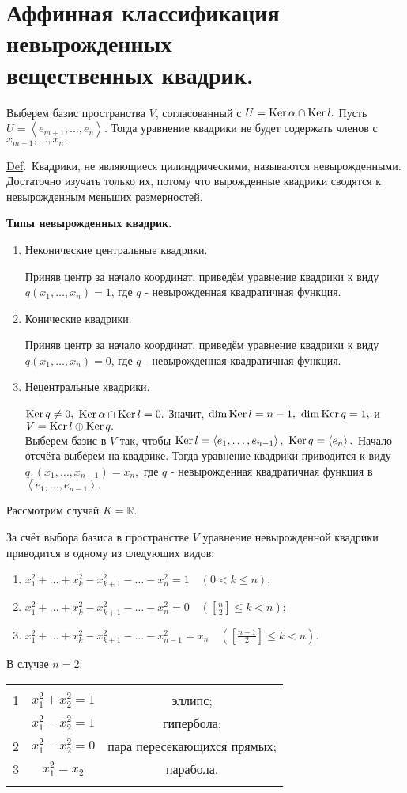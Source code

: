 \documentclass[draft]{article}%
\newcommand{\de}{\par\noindent\underline{Def}.\ }%
\newcommand{\ab}{\par\noindent}%
\newcommand{\lob}[1]{\left\langle#1\right\rangle}%
\newcommand{\ps}{\oplus}
\newcommand{\rom}[1]{{\rm#1\,}}
\renewcommand{\le}{\leqslant}
\begin{document}
\section{Аффинная классификация невырожденных\\ вещественных квадрик.}
\label{q45}
Выберем базис пространства $V$, согласованный с $U=\rom{Ker}\alpha\cap\rom{Ker}l.$ Пусть $U=\lob{e_{m+1},\dots,e_n}.$ Тогда
уравнение квадрики не будет содержать членов с\ \ $x_{m+1},\dots,x_n.$
\de Квадрики, не являющиеся цилиндрическими, называются невырожденными. Достаточно изучать только их, потому что
вырожденные квадрики сводятся к невырожденным меньших размерностей.
\ab
\centerline{\bf Типы невырожденных квадрик.}
\begin{enumerate}
    \item Неконические центральные квадрики.\ab Приняв центр за начало координат, приведём уравнение квадрики к виду
    $
    q(x_1,\dots,x_n)=1
    $, где $q$ - невырожденная квадратичная функция.
    \item Конические квадрики.\ab Приняв центр за начало координат, приведём уравнение квадрики к виду
    $
    q(x_1,\dots,x_n)=0
    $, где $q$ - невырожденная квадратичная функция.
    \item Нецентральные квадрики.\ab
    $\rom{Ker}q\ne 0,$ $\rom{Ker}\alpha\cap\rom{Ker}l=0.$ Значит, $\dim\rom{Ker}l=n-1,\ \dim\rom{Ker}q=1,$ и $V=\rom{Ker}l\ps\rom{Ker}q.$\\
    Выберем базис в $V$ так, чтобы $\rom{Ker}l=\lob{e_1,\dots,e_{n-1}},\ \rom{Ker}q=\lob{e_n}.$ Начало отсчёта выберем
    на квадрике. Тогда уравнение квадрики приводится к виду $q_1(x_1,\dots,x_{n-1})=x_n,$ где $q$ - невырожденная квадратичная
    функция в $\lob{e_1,\dots,e_{n-1}}.$
\end{enumerate}
Рассмотрим случай $K=\mathbb{R}.$
\ab За счёт выбора базиса в пространстве $V$ уравнение невырожденной квадрики приводится в одному из следующих видов:
\begin{enumerate}
    \item $x_1^2+\dots+x_k^2-x_{k+1}^2-\dots-x_n^2=1\quad(0<k\le n);$
    \item $x_1^2+\dots+x_k^2-x_{k+1}^2-\dots-x_n^2=0\quad\left(\left[\frac{\displaystyle n}{\displaystyle 2}\right]\le k<n\right);$
    \item $x_1^2+\dots+x_k^2-x_{k+1}^2-\dots-x_{n-1}^2=x_n\quad\left(\left[\frac{\displaystyle n-1}{\displaystyle 2}\right]\le k<n\right).$
\end{enumerate}
В случае $n=2$:\ab
\begin{tabular}{ccc}
  & & \\
  1 & $x_1^2+x_2^2=1$ & эллипс; \\

    & $x_1^2-x_2^2=1$ & гипербола; \\
  2 & $x_1^2-x_2^2=0$ & пара пересекающихся прямых; \\
  3 & $x_1^2=x_2$ & парабола. \\
   & & \\
\end{tabular}
\end{document}
